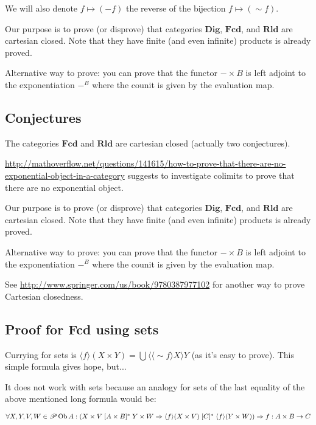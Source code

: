 We will also denote $f\mapsto (-f)$ the reverse of the bijection $f\mapsto (\sim f)$.

Our purpose is to prove (or disprove) that categories $\mathbf{Dig}$, $\mathbf{Fcd}$, and $\mathbf{Rld}$ are cartesian closed. Note that they have finite (and even infinite) products is already proved.

Alternative way to prove:
you can prove that the functor $-\times B$ is left adjoint to the exponentiation $-^B$ where the counit is given by the evaluation map.

\subsection{Conjectures}

\begin{conjecture}
  The categories $\mathbf{Fcd}$ and $\mathbf{Rld}$ are
  cartesian closed (actually two conjectures).
\end{conjecture}

\url{http://mathoverflow.net/questions/141615/how-to-prove-that-there-are-no-exponential-object-in-a-category}
suggests to investigate colimits to prove that there are no exponential
object.

Our purpose is to prove (or disprove) that categories $\mathbf{Dig}$, $\mathbf{Fcd}$, and $\mathbf{Rld}$ are cartesian closed. Note that they have finite (and even infinite) products is already proved.

Alternative way to prove:
you can prove that the functor $-\times B$ is left adjoint to the exponentiation $-^B$ where the counit is given by the evaluation map.

See \url{http://www.springer.com/us/book/9780387977102} for another way to prove Cartesian closedness.

\subsection{Proof for Fcd using sets}

Currying for sets is $\langle f \rangle ( X \times Y) = \bigcup \langle \langle \sim f \rangle X
\rangle Y$ (as it's easy to prove). This simple formula gives hope, but...

It does not work with sets because an analogy for sets of the last equality of the above mentioned long formula would be:

$\forall X, Y, V, W \in \mathscr{P} \operatorname{Ob} A : \left( X \times V \mathrel{[
A \times B]^{\ast}} Y \times W \Rightarrow \langle f \rangle ( X \times V)
\mathrel{[ C]^{\ast}} \langle f \rangle ( Y \times W) \right) \Rightarrow \\ f : A
\times B \rightarrow C$

